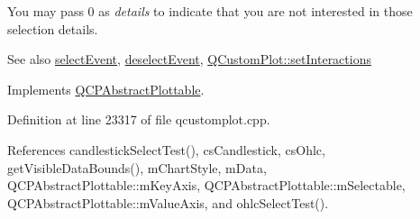 You may pass 0 as {\itshape details} to indicate that you are not interested in those selection details.

\begin{DoxySeeAlso}{See also}
\hyperlink{class_q_c_p_abstract_plottable_a16aaad02456aa23a759efd1ac90c79bf}{select\+Event}, \hyperlink{class_q_c_p_abstract_plottable_a6fa0d0f95560ea8b01ee13f296dab2b1}{deselect\+Event}, \hyperlink{class_q_custom_plot_a5ee1e2f6ae27419deca53e75907c27e5}{Q\+Custom\+Plot\+::set\+Interactions} 
\end{DoxySeeAlso}


Implements \hyperlink{class_q_c_p_abstract_plottable_a38efe9641d972992a3d44204bc80ec1d}{Q\+C\+P\+Abstract\+Plottable}.



Definition at line 23317 of file qcustomplot.\+cpp.



References candlestick\+Select\+Test(), cs\+Candlestick, cs\+Ohlc, get\+Visible\+Data\+Bounds(), m\+Chart\+Style, m\+Data, Q\+C\+P\+Abstract\+Plottable\+::m\+Key\+Axis, Q\+C\+P\+Abstract\+Plottable\+::m\+Selectable, Q\+C\+P\+Abstract\+Plottable\+::m\+Value\+Axis, and ohlc\+Select\+Test().


